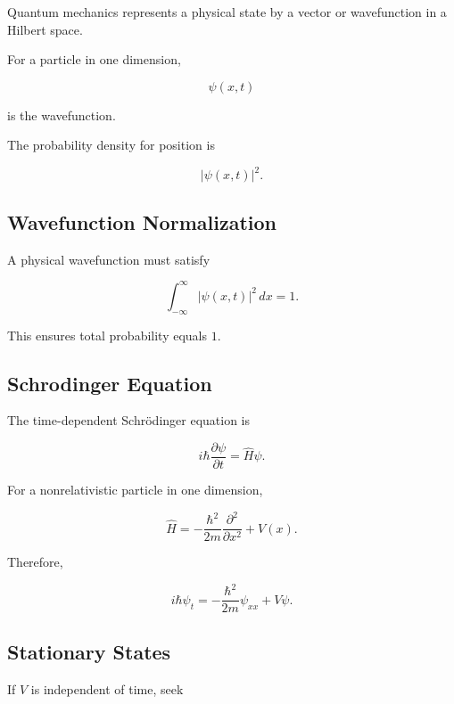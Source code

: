 Quantum mechanics represents a physical state by a vector or wavefunction in
a Hilbert space.

For a particle in one dimension,

\[
\boxed{
\psi(x,t)
}
\]

is the wavefunction.

The probability density for position is

\[
\boxed{
|\psi(x,t)|^2.
}
\]

\subsection{Wavefunction Normalization}
\label{subsec:wavefunction-normalization}

A physical wavefunction must satisfy

\[
\boxed{
\int_{-\infty}^{\infty}
|\psi(x,t)|^2\,dx
=
1.
}
\]

This ensures total probability equals \(1\).

\subsection{Schrodinger Equation}
\label{subsec:schrodinger-equation}

The time-dependent Schrödinger equation is

\[
\boxed{
i\hbar
\frac{\partial\psi}{\partial t}
=
\hat H\psi.
}
\]

For a nonrelativistic particle in one dimension,

\[
\boxed{
\hat H
=
-\frac{\hbar^2}{2m}
\frac{\partial^2}{\partial x^2}
+
V(x).
}
\]

Therefore,

\[
\boxed{
i\hbar\psi_t
=
-\frac{\hbar^2}{2m}\psi_{xx}
+
V\psi.
}
\]

\subsection{Stationary States}
\label{subsec:quantum-stationary-states}

If \(V\) is independent of time, seek

